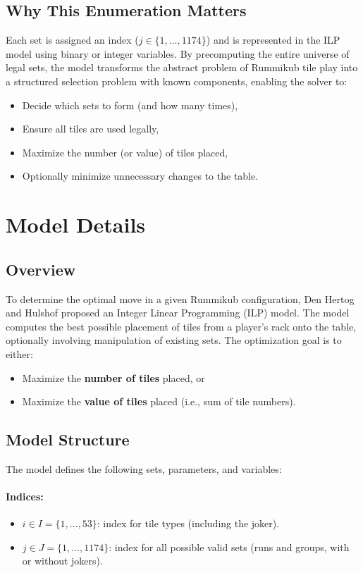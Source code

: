 \documentclass[12pt]{article}
\begin{document}
\subsection{Why This Enumeration Matters}

Each set is assigned an index ($j \in \{1, \dots, 1174\}$) and is represented in the ILP model using binary or integer variables. By precomputing the entire universe of legal sets, the model transforms the abstract problem of Rummikub tile play into a structured selection problem with known components, enabling the solver to:
\begin{itemize}
    \item Decide which sets to form (and how many times),
    \item Ensure all tiles are used legally,
    \item Maximize the number (or value) of tiles placed,
    \item Optionally minimize unnecessary changes to the table.
\end{itemize}

\section{Model Details}

\subsection{Overview}

To determine the optimal move in a given Rummikub configuration, Den Hertog and Hulshof proposed an Integer Linear Programming (ILP) model. The model computes the best possible placement of tiles from a player’s rack onto the table, optionally involving manipulation of existing sets. The optimization goal is to either:
\begin{itemize}
    \item Maximize the \textbf{number of tiles} placed, or
    \item Maximize the \textbf{value of tiles} placed (i.e., sum of tile numbers).
\end{itemize}

\subsection{Model Structure}

The model defines the following sets, parameters, and variables:

\paragraph{Indices:}
\begin{itemize}
    \item $i \in I = \{1, \dots, 53\}$: index for tile types (including the joker).
    \item $j \in J = \{1, \dots, 1174\}$: index for all possible valid sets (runs and groups, with or without jokers).
\end{itemize}
\end{document}
